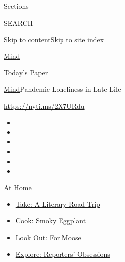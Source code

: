 Sections

SEARCH

\protect\hyperlink{site-content}{Skip to
content}\protect\hyperlink{site-index}{Skip to site index}

\href{https://www.nytimes3xbfgragh.onion/section/well/mind}{Mind}

\href{https://myaccount.nytimes3xbfgragh.onion/auth/login?response_type=cookie\&client_id=vi}{}

\href{https://www.nytimes3xbfgragh.onion/section/todayspaper}{Today's
Paper}

\href{/section/well/mind}{Mind}\textbar{}Pandemic Loneliness in Late
Life

\url{https://nyti.ms/2X7URdu}

\begin{itemize}
\item
\item
\item
\item
\item
\item
\end{itemize}

\href{https://www.nytimes3xbfgragh.onion/spotlight/at-home?action=click\&pgtype=Article\&state=default\&region=TOP_BANNER\&context=at_home_menu}{At
Home}

\begin{itemize}
\tightlist
\item
  \href{https://www.nytimes3xbfgragh.onion/2020/07/28/books/time-for-a-literary-road-trip.html?action=click\&pgtype=Article\&state=default\&region=TOP_BANNER\&context=at_home_menu}{Take:
  A Literary Road Trip}
\item
  \href{https://www.nytimes3xbfgragh.onion/2020/07/29/magazine/bored-with-your-home-cooking-some-smoky-eggplant-will-fix-that.html?action=click\&pgtype=Article\&state=default\&region=TOP_BANNER\&context=at_home_menu}{Cook:
  Smoky Eggplant}
\item
  \href{https://www.nytimes3xbfgragh.onion/2020/07/27/travel/moose-michigan-isle-royale.html?action=click\&pgtype=Article\&state=default\&region=TOP_BANNER\&context=at_home_menu}{Look
  Out: For Moose}
\item
  \href{https://www.nytimes3xbfgragh.onion/interactive/2020/at-home/even-more-reporters-editors-diaries-lists-recommendations.html?action=click\&pgtype=Article\&state=default\&region=TOP_BANNER\&context=at_home_menu}{Explore:
  Reporters' Obsessions}
\end{itemize}

